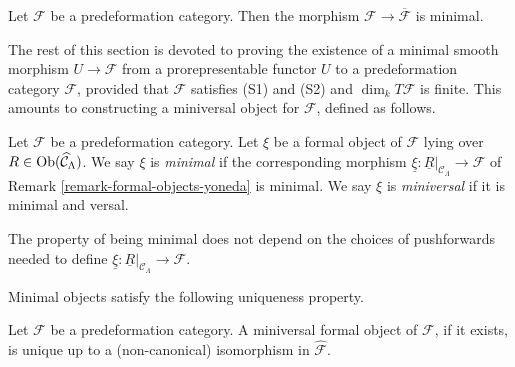 \begin{remark}
Let $\mathcal F$ be a predeformation category.  Then the morphism $\mathcal F 
\rightarrow \overline{\mathcal F}$ is minimal.
\end{remark}

\noindent
The rest of this section is devoted to proving the existence of a minimal 
smooth morphism $U \rightarrow \mathcal F$ from a prorepresentable functor $U$ 
to a predeformation category $\mathcal F$, provided that $\mathcal F$ satisfies 
(S1) and (S2) and $\dim_{k} T\mathcal F$ is finite.  This amounts to 
constructing a miniversal object for $\mathcal F$, defined as follows.

\begin{definition}
\label{definition-miniversal-object}
Let $\mathcal F$ be a predeformation category.  Let $\xi$ be a formal object of 
$\mathcal F$ lying over $R \in \textnormal{Ob}(\widehat{\mathcal 
C}_{\Lambda})$.  We say $\xi$ is \emph{minimal} if the corresponding morphism 
$\underline{\xi}: \underline{R}|_{\mathcal C_{\Lambda}} \rightarrow \mathcal F$ 
of Remark \ref{remark-formal-objects-yoneda} is minimal.  We say $\xi$ is 
\emph{miniversal} if it is minimal and versal.
\end{definition}

\begin{remark}
The property of being minimal does not depend on the choices of pushforwards 
needed to define $\underline{\xi}: \underline{R}|_{\mathcal C_{\Lambda}} 
\rightarrow \mathcal F$.
\end{remark}

\noindent
Minimal objects satisfy the following uniqueness property.
\begin{lemma}
\label{lemma-miniversal-object-unique}
Let $\mathcal F$ be a predeformation category.  A miniversal formal object of 
$\mathcal F$, if it exists, is unique up to a (non-canonical) isomorphism in 
$\widehat{\mathcal F}$.
\end{lemma}

